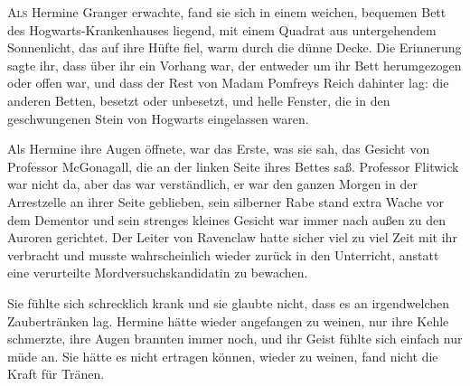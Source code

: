 
\lettrine{A}{ls} Hermine Granger erwachte, fand sie sich in einem weichen, bequemen Bett des Hogwarts-Krankenhauses liegend, mit einem Quadrat aus untergehendem Sonnenlicht, das auf ihre Hüfte fiel, warm durch die dünne Decke. Die Erinnerung sagte ihr, dass über ihr ein Vorhang war, der entweder um ihr Bett herumgezogen oder offen war, und dass der Rest von Madam Pomfreys Reich dahinter lag: die anderen Betten, besetzt oder unbesetzt, und helle Fenster, die in den geschwungenen Stein von Hogwarts eingelassen waren.

Als Hermine ihre Augen öffnete, war das Erste, was sie sah, das Gesicht von Professor McGonagall, die an der linken Seite ihres Bettes saß. Professor Flitwick war nicht da, aber das war verständlich, er war den ganzen Morgen in der Arrestzelle an ihrer Seite geblieben, sein silberner Rabe stand extra Wache vor dem Dementor und sein strenges kleines Gesicht war immer nach außen zu den Auroren gerichtet. Der Leiter von Ravenclaw hatte sicher viel zu viel Zeit mit ihr verbracht und musste wahrscheinlich wieder zurück in den Unterricht, anstatt eine verurteilte Mordversuchskandidatin zu bewachen.

Sie fühlte sich schrecklich krank und sie glaubte nicht, dass es an irgendwelchen Zaubertränken lag. Hermine hätte wieder angefangen zu weinen, nur ihre Kehle schmerzte, ihre Augen brannten immer noch, und ihr Geist fühlte sich einfach nur müde an. Sie hätte es nicht ertragen können, wieder zu weinen, fand nicht die Kraft für Tränen.

